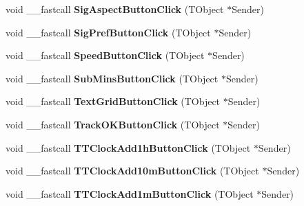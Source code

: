 \begin{DoxyCompactItemize}
\item 
\mbox{\label{class_t_interface_ac1e9ee3443ac91e2687e6f154d15521a}} 
void \+\_\+\+\_\+fastcall {\bfseries Sig\+Aspect\+Button\+Click} (T\+Object $\ast$Sender)
\item 
\mbox{\label{class_t_interface_a0242a91e5add0fc16e67b9e3f6a22898}} 
void \+\_\+\+\_\+fastcall {\bfseries Sig\+Pref\+Button\+Click} (T\+Object $\ast$Sender)
\item 
\mbox{\label{class_t_interface_ab1487b7a54ebacf27d7b980c65723d18}} 
void \+\_\+\+\_\+fastcall {\bfseries Speed\+Button\+Click} (T\+Object $\ast$Sender)
\item 
\mbox{\label{class_t_interface_ad0934d754138e9d12f390d9c538448e1}} 
void \+\_\+\+\_\+fastcall {\bfseries Sub\+Mins\+Button\+Click} (T\+Object $\ast$Sender)
\item 
\mbox{\label{class_t_interface_a16d199b0196b6e058b60f92f7a6978aa}} 
void \+\_\+\+\_\+fastcall {\bfseries Text\+Grid\+Button\+Click} (T\+Object $\ast$Sender)
\item 
\mbox{\label{class_t_interface_aab42b12ff3ba43ad2f70994b5399dd90}} 
void \+\_\+\+\_\+fastcall {\bfseries Track\+O\+K\+Button\+Click} (T\+Object $\ast$Sender)
\item 
\mbox{\label{class_t_interface_af8dbf714b9dfe7f6df1c4fe4ad06655e}} 
void \+\_\+\+\_\+fastcall {\bfseries T\+T\+Clock\+Add1h\+Button\+Click} (T\+Object $\ast$Sender)
\item 
\mbox{\label{class_t_interface_a3590355ce00174b1351d857578f850c8}} 
void \+\_\+\+\_\+fastcall {\bfseries T\+T\+Clock\+Add10m\+Button\+Click} (T\+Object $\ast$Sender)
\item 
\mbox{\label{class_t_interface_ae46427a550c7fc7dc1000003063ccb0e}} 
void \+\_\+\+\_\+fastcall {\bfseries T\+T\+Clock\+Add1m\+Button\+Click} (T\+Object $\ast$Sender)
\item 
\mbox{\label{class_t_interface_a2c66ea203f3504fc2a9e5860a6c6d789}} 

\end{DoxyCompactItemize}
